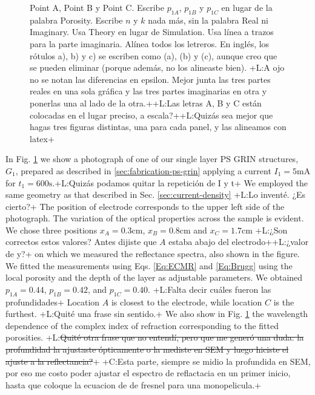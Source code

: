 \documentclass{article}
\newcommand{\notaL}[1]{{\color{blue}+L:#1+}}
\newcommand{\notaC}[1]{{\color{green}+C:#1+}}
\begin{document}
\begin{figure}
{{      Point A, Point B y Point C. Escribe $p_{1A}$, $p_{1B}$ y $p_{1C}$ en lugar
      de la palabra Porosity. Escribe $n$ y $k$ nada más, sin la
      palabra Real ni Imaginary. Usa Theory en lugar de
      Simulation. Usa línea a trazos para la parte
      imaginaria. Alínea todos los letreros. En inglés, los rótulos
      a), b) y c) se escriben como (a), (b) y (c), aunque creo que se
      pueden eliminar (porque además, no los alineaste bien). }
  \notaL{A ojo no se notan las diferencias en epsilon. Mejor junta las
  tres partes reales en una sola gráfica y las tres partes imaginarias
en otra y ponerlas una al lado de la otra.}\notaL{Las letras A, B y C
están colocadas en el lugar preciso, a escala?}\notaL{Quizás sea mejor
que hagas tres figuras distintas, una para cada panel, y las alineamos
con latex}}
  \label{fig:DR3}
\end{figure}
 In Fig. \ref{fig:DR3} we show a photograph of one of our single layer PS GRIN
 structures, $G_1$, prepared as described in
 \ref{sec:fabrication-ps-grin} applying a current $I_1=5\text{mA}$ for
 $t_1=600\text{s}$.\notaL{Quizás podamos quitar la repetición de I y
   t} We employed the same geometry as that described in
 Sec. \ref{sec:current-density} \notaL{Lo inventé. ¿Es cierto?}
The position of electrode corresponds to the upper left side of the
photograph. The variation of the optical properties across the
sample is evident. We chose three positions $x_A=0.3\text{cm}$,
$x_B=0.8\text{cm}$ and $x_C=1.7\text{cm}$ \notaL{¿Son correctos estos
  valores? Antes dijiste que $A$ estaba abajo del electrodo}\notaL{¿valor de y?} on
which we measured the reflectance spectra, also shown in the figure.
We fitted the measurements using Eqs. \eqref{Eq:ECMR} and
\eqref{Eq:Brugg} using the local porosity and the depth of the layer
as adjustable parameters.  We obtained $p_{1A}=0.44$, $p_{1B}=0.42$, and
$p_{1C}= 0.40$. \notaL{Falta decir cuáles fueron las profundidades}
Location $A$ is
closest to the electrode, while location $C$ is the furthest.
\notaL{Quité una frase sin sentido.}
We also show in Fig. \ref{fig:DR3} the wavelength dependence of
 the complex index of refraction corresponding to the fitted porosities.
\notaL{\sout{Quité otra frase que no entendí, pero que me generó una duda:
  la profundidad la ajustaste ópticamente o la mediste en SEM y luego
  hiciste el ajuste a la reflectancia?}} \notaC{Esta parte, siempre se midio la
  profundida en SEM, por eso me costo poder ajustar el espectro de reflactacia
  en un primer inicio, hasta que coloque la ecuacion de de fresnel
  para una monopelicula.}
\end{document}
